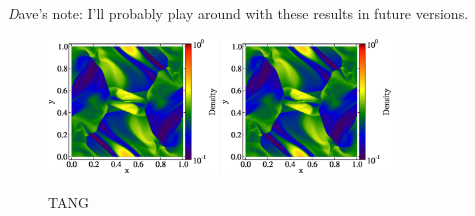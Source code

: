 {\emph Dave's note:  I'll probably play around with these results in future
versions.}

\begin{figure}
\begin{center}
\includegraphics[width=0.4\textwidth]{figures/MHDCT_OrszagTang_Density.eps}
\includegraphics[width=0.4\textwidth]{figures/MHDDedner_OrszagTang_Density.eps}
\caption{TANG}
\label{fig.orszag}
\end{center}
\end{figure}


